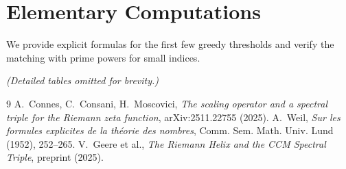 \documentclass[12pt,a4paper,twoside,openright]{book}
\begin{document}
\appendix
\chapter{Elementary Computations}
We provide explicit formulas for the first few greedy thresholds and verify the matching with prime powers for small indices.

\textit{(Detailed tables omitted for brevity.)}

\begin{thebibliography}{9}
A.~Connes, C.~Consani, H.~Moscovici, \emph{The scaling operator and a spectral triple for the Riemann zeta function}, arXiv:2511.22755 (2025).
A.~Weil, \emph{Sur les formules explicites de la th\'eorie des nombres}, Comm. Sem. Math. Univ. Lund (1952), 252--265.
V.~Geere et al., \emph{The Riemann Helix and the CCM Spectral Triple}, preprint (2025).
\end{thebibliography}
\end{document}
